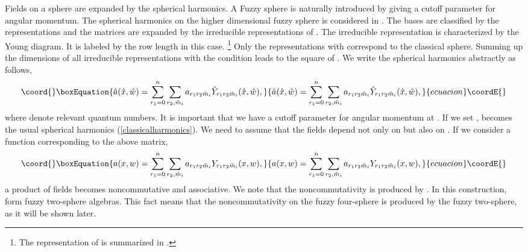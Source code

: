 \documentclass[a4paper,11pt]{article}
\begin{document}
Fields on a sphere are expanded by the spherical harmonics. 
A Fuzzy sphere is naturally introduced by giving 
a cutoff parameter for angular momentum. 
The spherical harmonics on the 
higher dimensional fuzzy sphere is considered in 
\cite{ramgoo,chenhou}. 
The bases are classified by the \coordHE{} representations 
and the matrices are expanded by the irreducible 
representations of \coordHE{}. 
The irreducible representation is characterized by the Young diagram. 
It is labeled by the row length \coordHE{} 
in this case. \footnote{
The representation of \coordHE{} is summarized in \cite{ramgoo}.}
Only the representations with \coordHE{} correspond to 
the classical sphere.
Summing up the dimensions of all irreducible representations 
with the condition \coordHE{} leads 
to the square of \coordHE{}. 
We write the spherical harmonics abstractly as follows, 
\begin{equation}\coord{}\boxEquation{ 
\hat{a}(\hat{x},\hat{w})=\sum_{r_{1}=0}^{n}
\sum_{r_{2},\tilde{m}_{i}} 
a_{r_{1}r_{2}\tilde{m}_{i}}
\hat{Y}_{r_{1}r_{2}\tilde{m}_{i}}(\hat{x},\hat{w}), 
}{ 
\hat{a}(\hat{x},\hat{w})=\sum_{r_{1}=0}^{n}
\sum_{r_{2},\tilde{m}_{i}} 
a_{r_{1}r_{2}\tilde{m}_{i}}
\hat{Y}_{r_{1}r_{2}\tilde{m}_{i}}(\hat{x},\hat{w}), 
}{ecuacion}\coordE{}\end{equation} 
where \coordHE{} denote relevant quantum numbers. 
It is important that we have a cutoff parameter for 
angular momentum \coordHE{} at \coordHE{}\cite{ramgoo}. 
If we set \coordHE{}, 
\coordHE{} becomes 
the usual spherical harmonics (\ref{classicalharmonics}). 
We need to assume that the fields 
depend not only on \coordHE{} but also on \coordHE{}. 
If we consider a function corresponding to 
the above matrix, 
\begin{equation}\coord{}\boxEquation{ 
a(x,w)=\sum_{r_{1}=0}^{n}\sum_{r_{2},\tilde{m}_{i}}
a_{r_{1}r_{2}\tilde{m}_{i}}
Y_{r_{1}r_{2}\tilde{m}_{i}}(x,w), 
}{ 
a(x,w)=\sum_{r_{1}=0}^{n}\sum_{r_{2},\tilde{m}_{i}}
a_{r_{1}r_{2}\tilde{m}_{i}}
Y_{r_{1}r_{2}\tilde{m}_{i}}(x,w), 
}{ecuacion}\coordE{}\end{equation} 
a product of fields becomes noncommutative 
and associative. 
We note that the noncommutativity is produced by \coordHE{}. 
In this construction, 
\coordHE{} form fuzzy two-sphere algebras. 
This fact means that the noncommutativity 
on the fuzzy four-sphere 
is produced by the fuzzy two-sphere, as 
it will be shown later.  
\end{document}
